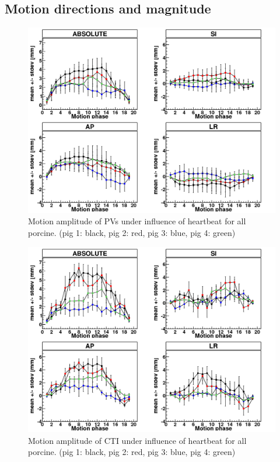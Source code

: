 \documentclass[type=dr, dr=rernat, accentcolor=tud7b,colorbacktitle, bigchapter, openright, twoside, 12pt ]{tudthesis}
\begin{document}
\subsection{Motion directions and magnitude}




\begin{figure}[H]
\begin{center}
 \includegraphics[scale=0.3]{Mayo_PV_HB.png}
\caption{Motion amplitude of PVs under influence of heartbeat for all porcine. (pig 1: black, pig 2: red, pig 3: blue, 
pig 4: green) }
\end{center}
\label{motion_hb_all_pv}
\end{figure}

\begin{figure}[H]
\begin{center}
 \includegraphics[scale=0.3]{Mayo_CTI_HB.png}
\caption{Motion amplitude of CTI under influence of heartbeat for all porcine. (pig 1: black, pig 2: red, pig 3: blue, 
pig 4: green) }
\end{center}
\label{motion_hb_all_cti}
\end{figure}
\end{document}

